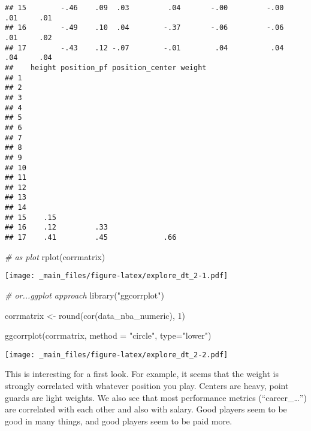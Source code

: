 \documentclass[
]{book}
\newenvironment{Shaded}{\begin{snugshade}}{\end{snugshade}}
\newcommand{\AttributeTok}[1]{\textcolor[rgb]{0.77,0.63,0.00}{#1}}
\newcommand{\CommentTok}[1]{\textcolor[rgb]{0.56,0.35,0.01}{\textit{#1}}}
\newcommand{\DecValTok}[1]{\textcolor[rgb]{0.00,0.00,0.81}{#1}}
\newcommand{\FunctionTok}[1]{\textcolor[rgb]{0.00,0.00,0.00}{#1}}
\newcommand{\NormalTok}[1]{#1}
\newcommand{\OtherTok}[1]{\textcolor[rgb]{0.56,0.35,0.01}{#1}}
\newcommand{\StringTok}[1]{\textcolor[rgb]{0.31,0.60,0.02}{#1}}
\begin{document}
\begin{verbatim}
## 15        -.46    .09  .03         .04       -.00         -.00     .01     .01
## 16        -.49    .10  .04        -.37       -.06         -.06     .01     .02
## 17        -.43    .12 -.07        -.01        .04          .04     .04     .04
##    height position_pf position_center weight
## 1                                           
## 2                                           
## 3                                           
## 4                                           
## 5                                           
## 6                                           
## 7                                           
## 8                                           
## 9                                           
## 10                                          
## 11                                          
## 12                                          
## 13                                          
## 14                                          
## 15    .15                                   
## 16    .12         .33                       
## 17    .41         .45             .66
\end{verbatim}

\begin{Shaded}
\begin{Highlighting}[]
\CommentTok{\# as plot}
\FunctionTok{rplot}\NormalTok{(corrmatrix)}
\end{Highlighting}
\end{Shaded}

\texttt{[image: \_main\_files/figure-latex/explore\_dt\_2-1.pdf]}

\begin{Shaded}
\begin{Highlighting}[]
\CommentTok{\# or...ggplot approach}
\FunctionTok{library}\NormalTok{(}\StringTok{"ggcorrplot"}\NormalTok{)}

\NormalTok{corrmatrix }\OtherTok{\textless{}{-}} \FunctionTok{round}\NormalTok{(}\FunctionTok{cor}\NormalTok{(data\_nba\_numeric), }\DecValTok{1}\NormalTok{)}

\FunctionTok{ggcorrplot}\NormalTok{(corrmatrix,}
           \AttributeTok{method =} \StringTok{"circle"}\NormalTok{,}
           \AttributeTok{type=}\StringTok{"lower"}\NormalTok{)}
\end{Highlighting}
\end{Shaded}

\texttt{[image: \_main\_files/figure-latex/explore\_dt\_2-2.pdf]}

This is interesting for a first look. For example, it seems that the weight is
strongly correlated with whatever position you play. Centers are heavy, point
guards are light weights.
We also see that most performance metrics (``career\_\ldots{}'') are correlated with each
other and also with salary. Good players seem to be good in many things, and
good players seem to be paid more.
\end{document}
